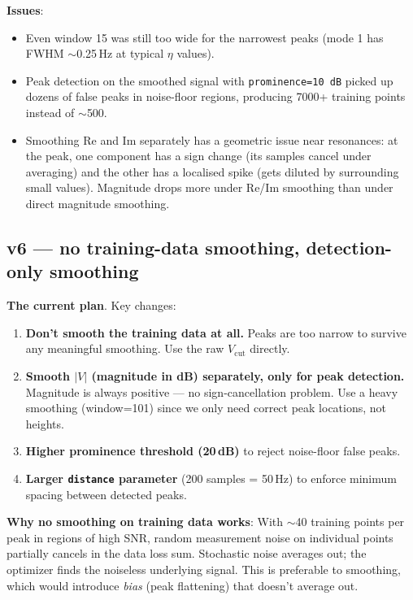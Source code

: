 \documentclass[11pt,a4paper]{article}
\begin{document}
\textbf{Issues}:
\begin{itemize}[leftmargin=*, itemsep=2pt]
\item Even window 15 was still too wide for the narrowest peaks (mode 1 has FWHM $\sim$0.25\,Hz at typical $\eta$ values).
\item Peak detection on the smoothed signal with \texttt{prominence=10\,dB} picked up dozens of false peaks in noise-floor regions, producing 7000+ training points instead of $\sim$500.
\item Smoothing Re and Im separately has a geometric issue near resonances: at the peak, one component has a sign change (its samples cancel under averaging) and the other has a localised spike (gets diluted by surrounding small values). Magnitude drops more under Re/Im smoothing than under direct magnitude smoothing.
\end{itemize}

\subsection{v6 --- no training-data smoothing, detection-only smoothing}

\textbf{The current plan}. Key changes:
\begin{enumerate}[leftmargin=*, itemsep=2pt]
\item \textbf{Don't smooth the training data at all.} Peaks are too narrow to survive any meaningful smoothing. Use the raw $V_\text{cut}$ directly.
\item \textbf{Smooth $|V|$ (magnitude in dB) separately, only for peak detection.} Magnitude is always positive --- no sign-cancellation problem. Use a heavy smoothing (window=101) since we only need correct peak locations, not heights.
\item \textbf{Higher prominence threshold (20\,dB)} to reject noise-floor false peaks.
\item \textbf{Larger \texttt{distance} parameter} (200 samples = 50\,Hz) to enforce minimum spacing between detected peaks.
\end{enumerate}

\textbf{Why no smoothing on training data works}: With $\sim$40 training points per peak in regions of high SNR, random measurement noise on individual points partially cancels in the data loss sum. Stochastic noise averages out; the optimizer finds the noiseless underlying signal. This is preferable to smoothing, which would introduce \emph{bias} (peak flattening) that doesn't average out.
\end{document}
